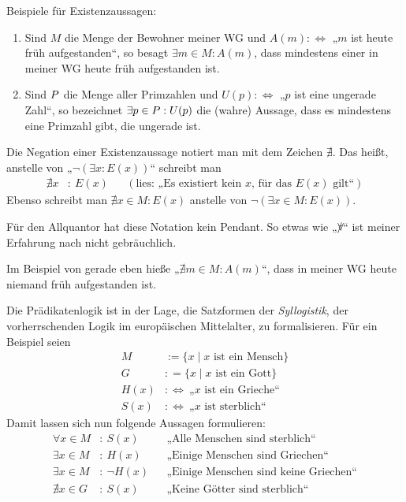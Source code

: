 \begin{bsp}
    Beispiele für Existenzaussagen:
    \begin{enumerate}
        \item Sind $M$ die Menge der Bewohner meiner WG und $A(m):\Leftrightarrow$ „$m$ ist heute früh aufgestanden“, so besagt $\exists m\in M: A(m)$, dass mindestens einer in meiner WG heute früh aufgestanden ist.
        \item Sind $\relax P$ die Menge aller Primzahlen und $U(p):\Leftrightarrow$ „$p$ ist eine ungerade Zahl“, so bezeichnet $\exists p\in \relax P: U(p)$ die (wahre) Aussage, dass es mindestens eine Primzahl gibt, die ungerade ist.
    \end{enumerate}
\end{bsp}


\begin{nota}
    Die Negation einer Existenzaussage notiert man mit dem Zeichen $\nexists$. Das heißt, anstelle von „$\neg (\exists x: E(x))$“ schreibt man
    \begin{align*}
        \nexists x &:\ E(x) && (\text{lies: „Es existiert kein $x$, für das $E(x)$ gilt“})
    \end{align*}
    Ebenso schreibt man $\nexists x\in M: E(x)$ anstelle von $\neg (\exists x\in M: E(x))$.
    
    Für den Allquantor hat diese Notation kein Pendant. So etwas wie „$\forall\mkern-11mu/$“ ist meiner Erfahrung nach nicht gebräuchlich.
\end{nota}


\begin{bsp}
    Im Beispiel von gerade eben hieße „$\nexists m\in M: A(m)$“, dass in meiner WG heute niemand früh aufgestanden ist.
\end{bsp}


\begin{bsp}[Syllogistik]
    Die Prädikatenlogik ist in der Lage, die Satzformen der \emph{Syllogistik}, der vorherrschenden Logik im europäischen Mittelalter, zu formalisieren. Für ein Beispiel seien
    \begin{align*}
        M & := \{ x\mid  \text{$x$ ist ein Mensch} \} \\
        G &  : = \{x\mid \text{$x$ ist ein Gott} \} \\
        H(x) & :\Leftrightarrow\ \text{„$x$ ist ein Grieche“} \\
        S(x) & :\Leftrightarrow\ \text{„$x$ ist sterblich“}
    \end{align*}
    Damit lassen sich nun folgende Aussagen formulieren:
    \begin{align*}
        \forall x\in M& :\ S(x) && \text{„Alle Menschen sind sterblich“} \\
        \exists x \in M & :\ H(x)&& \text{„Einige Menschen sind Griechen“} \\
        \exists x \in M& :\ \neg H(x) && \text{„Einige Menschen sind keine Griechen“} \\
        \nexists x\in G & :\ S(x)&& \text{„Keine Götter sind sterblich“}
    \end{align*}
\end{bsp}


